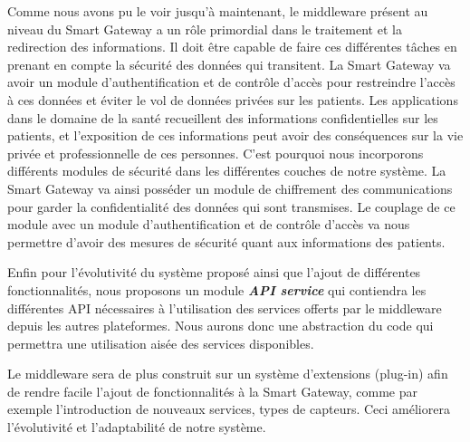 Comme nous avons pu le voir jusqu’à maintenant, le middleware présent au niveau du Smart Gateway a un rôle primordial dans le traitement et la redirection des informations. Il doit être capable de faire ces différentes tâches en prenant en compte la sécurité des données qui transitent. La Smart Gateway va avoir un module d’authentification et de contrôle d’accès pour restreindre l’accès à ces données et éviter le vol de données privées sur les patients. Les applications dans le domaine de la santé recueillent des informations confidentielles sur les patients, et l’exposition de ces informations peut avoir des conséquences sur la vie privée et professionnelle de ces personnes. C’est pourquoi nous incorporons différents modules de sécurité dans les différentes couches de notre système. La Smart Gateway va ainsi posséder un module de chiffrement des communications pour garder la confidentialité des données qui sont transmises. Le couplage de ce module avec un module d’authentification et de contrôle d’accès va nous permettre d’avoir des mesures de sécurité quant aux informations des patients.

Enfin pour l’évolutivité du système proposé ainsi que l’ajout de différentes fonctionnalités, nous proposons un module \textbf{\textit{API service}} qui contiendra les différentes API nécessaires à l'utilisation des services offerts par le middleware depuis les autres plateformes. Nous aurons donc une abstraction du code qui permettra une utilisation aisée des services disponibles.

Le middleware sera de plus construit sur un système d'extensions (plug-in) afin de rendre facile l’ajout de fonctionnalités à la Smart Gateway, comme par exemple l’introduction de nouveaux services, types de capteurs. Ceci améliorera l'évolutivité et l'adaptabilité de notre système.
